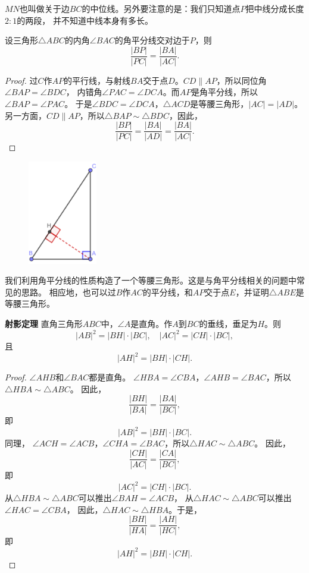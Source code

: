 \documentclass[12pt,UTF8]{ctexbook}
\begin{document}
$MN$也叫做关于边$BC$的中位线。另外要注意的是：我们只知道点$P$把中线分成长度$2:1$的两段，
并不知道中线本身有多长。

\begin{tm}\label{tm:0-2-1}
    设三角形$\triangle ABC$的内角$\angle BAC$的角平分线交对边于$P$，则
    $$ \frac{|BP|}{|PC|} = \frac{|BA|}{|AC|}.$$
\end{tm}
\begin{proof}
    过$C$作$AP$的平行线，与射线$BA$交于点$D$。$CD \parallel AP$，所以同位角$\angle BAP = \angle BDC$，
    内错角$\angle PAC = \angle DCA$。而$AP$是角平分线，所以$\angle BAP = \angle PAC$。
    于是$\angle BDC = \angle DCA$，$\triangle ACD$是等腰三角形，$|AC| = |AD|$。\\
    另一方面，$CD \parallel AP$，所以$\triangle BAP \sim \triangle BDC$，因此，
    $$\frac{|BP|}{|PC|} = \frac{|BA|}{|AD|} = \frac{|BA|}{|AC|}.$$
\end{proof}

\begin{figure} %
    \vspace{-80pt}
    \includegraphics[width=0.27\textwidth]{tu/三角形10.png}
\end{figure}

我们利用角平分线的性质构造了一个等腰三角形。这是与角平分线相关的问题中常见的思路。
相应地，也可以过$B$作$AC$的平分线，和$AP$交于点$E$，并证明$\triangle ABE$是等腰三角形。

\begin{tm}{\textbf{射影定理}}\label{tm:0-2-2}
    直角三角形$ABC$中，$\angle A$是直角。作$A$到$BC$的垂线，垂足为$H$。则
    $$ |AB|^2 = |BH|\cdot |BC|, \quad |AC|^2 = |CH|\cdot |BC|,$$
    且
    $$|AH|^2 = |BH| \cdot |CH|.$$
\end{tm}
\begin{proof}
    $\angle AHB$和$\angle BAC$都是直角。
    $\angle HBA = \angle CBA$，$\angle AHB = \angle BAC$，所以$\triangle HBA \sim \triangle ABC$。
    因此，
    $$ \frac{|BH|}{|BA|} = \frac{|BA|}{|BC|},$$
    即
    $$ |AB|^2 = |BH|\cdot |BC|.$$
    同理，
    $\angle ACH = \angle ACB$，$\angle CHA = \angle BAC$，所以$\triangle HAC \sim \triangle ABC$。
    因此，
    $$ \frac{|CH|}{|AC|} = \frac{|CA|}{|BC|},$$
    即
    $$ |AC|^2 = |CH|\cdot |BC|.$$
    从$\triangle HBA \sim \triangle ABC$可以推出$\angle BAH = \angle ACB$，
    从$\triangle HAC \sim \triangle ABC$可以推出$\angle HAC = \angle CBA$，
    因此，$\triangle HAC \sim \triangle HBA$。于是，
    $$ \frac{|BH|}{|HA|} = \frac{|AH|}{|HC|},$$
    即
    $$|AH|^2 = |BH| \cdot |CH|.$$
\end{proof}
\end{document}
